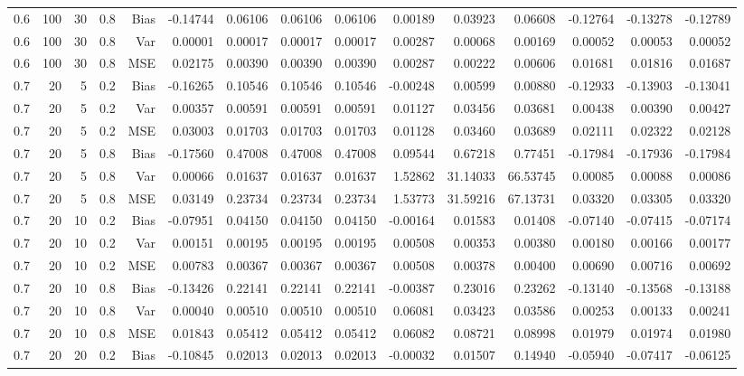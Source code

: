 \begin{table}[!htbp]
\begin{tabular}{lrrrrrrrrrrrrrr}
0.6 & 100 & 30 & 0.8 & Bias & -0.14744 & 0.06106 & 0.06106 & 0.06106 & 0.00189 & 0.03923 & 0.06608 & -0.12764 & -0.13278 & -0.12789 \\
0.6 & 100 & 30 & 0.8 & Var & 0.00001 & 0.00017 & 0.00017 & 0.00017 & 0.00287 & 0.00068 & 0.00169 & 0.00052 & 0.00053 & 0.00052 \\
0.6 & 100 & 30 & 0.8 & MSE & 0.02175 & 0.00390 & 0.00390 & 0.00390 & 0.00287 & 0.00222 & 0.00606 & 0.01681 & 0.01816 & 0.01687 \\
0.7 &  20 &  5 & 0.2 & Bias & -0.16265 & 0.10546 & 0.10546 & 0.10546 & -0.00248 & 0.00599 & 0.00880 & -0.12933 & -0.13903 & -0.13041 \\
0.7 &  20 &  5 & 0.2 & Var & 0.00357 & 0.00591 & 0.00591 & 0.00591 & 0.01127 & 0.03456 & 0.03681 & 0.00438 & 0.00390 & 0.00427 \\
0.7 &  20 &  5 & 0.2 & MSE & 0.03003 & 0.01703 & 0.01703 & 0.01703 & 0.01128 & 0.03460 & 0.03689 & 0.02111 & 0.02322 & 0.02128 \\
0.7 &  20 &  5 & 0.8 & Bias & -0.17560 & 0.47008 & 0.47008 & 0.47008 & 0.09544 & 0.67218 & 0.77451 & -0.17984 & -0.17936 & -0.17984 \\
0.7 &  20 &  5 & 0.8 & Var & 0.00066 & 0.01637 & 0.01637 & 0.01637 & 1.52862 & 31.14033 & 66.53745 & 0.00085 & 0.00088 & 0.00086 \\
0.7 &  20 &  5 & 0.8 & MSE & 0.03149 & 0.23734 & 0.23734 & 0.23734 & 1.53773 & 31.59216 & 67.13731 & 0.03320 & 0.03305 & 0.03320 \\
0.7 &  20 & 10 & 0.2 & Bias & -0.07951 & 0.04150 & 0.04150 & 0.04150 & -0.00164 & 0.01583 & 0.01408 & -0.07140 & -0.07415 & -0.07174 \\
0.7 &  20 & 10 & 0.2 & Var & 0.00151 & 0.00195 & 0.00195 & 0.00195 & 0.00508 & 0.00353 & 0.00380 & 0.00180 & 0.00166 & 0.00177 \\
0.7 &  20 & 10 & 0.2 & MSE & 0.00783 & 0.00367 & 0.00367 & 0.00367 & 0.00508 & 0.00378 & 0.00400 & 0.00690 & 0.00716 & 0.00692 \\
0.7 &  20 & 10 & 0.8 & Bias & -0.13426 & 0.22141 & 0.22141 & 0.22141 & -0.00387 & 0.23016 & 0.23262 & -0.13140 & -0.13568 & -0.13188 \\
0.7 &  20 & 10 & 0.8 & Var & 0.00040 & 0.00510 & 0.00510 & 0.00510 & 0.06081 & 0.03423 & 0.03586 & 0.00253 & 0.00133 & 0.00241 \\
0.7 &  20 & 10 & 0.8 & MSE & 0.01843 & 0.05412 & 0.05412 & 0.05412 & 0.06082 & 0.08721 & 0.08998 & 0.01979 & 0.01974 & 0.01980 \\
0.7 &  20 & 20 & 0.2 & Bias & -0.10845 & 0.02013 & 0.02013 & 0.02013 & -0.00032 & 0.01507 & 0.14940 & -0.05940 & -0.07417 & -0.06125 \\

\end{tabular}
\end{table}
